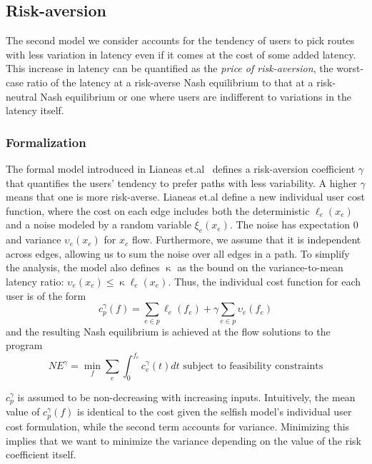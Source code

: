 \subsection{Risk-aversion}
The second model we consider accounts for the tendency of users to pick routes with less variation in latency even if it comes at the cost of some added latency. This increase in latency can be quantified as the {\em{price of risk-aversion}},
the worst-case ratio of the latency at a risk-averse Nash equilibrium to that at a risk-neutral
Nash equilibrium or one where users are indifferent to variations in the latency itself.


\subsubsection{Formalization} The formal model introduced in Lianeas et.al~\cite{risk-averse} defines 
a risk-aversion coefficient $\gamma$ that quantifies the users' tendency to prefer paths with less variability. 
A higher $\gamma$ means that one is more risk-averse. Lianeas et.al define a new individual user cost function, where 
the cost on each edge includes both the deterministic $\ell_e(x_e)$ and a noise modeled by a random variable $\xi_e(x_e)$. The noise has expectation $0$ and variance $\upsilon_e(x_e)$ for $x_e$ flow. Furthermore, we assume that it is independent across edges, allowing us to sum the noise over all edges in a path. To simplify the analysis, the model also defines $\upkappa$ as the bound on the variance-to-mean latency ratio:
$\upsilon_e(x_e) \leq \upkappa \ell_e(x_e)$.
Thus, the individual cost function for each user is of the form
$$c^\gamma_p(f) = \sum_{e \in p}\ell_e(f_e) + \gamma \sum_{e \in p}\upsilon_e(f_e)$$
and the resulting Nash equilibrium is achieved at the flow solutions to the program
$$NE^\gamma= \min_f\sum_e\int_0^{f_e}c_e^\gamma(t)dt \text{ subject to feasibility constraints}$$

$c^\gamma_p$ is assumed to be non-decreasing with increasing inputs. Intuitively, the mean value of $c^\gamma_p(f)$ is identical to the cost given the selfish model's individual user cost formulation, while the second term accounts for variance. Minimizing this implies that we want to minimize the variance depending on the value of the risk coefficient itself.


